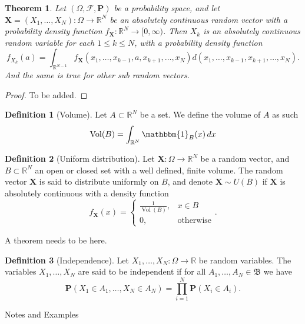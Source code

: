 \documentclass[11pt,a4paper]{article}
\theoremstyle{definition}
\newtheorem{definition}{Definition}[section]
\theoremstyle{plain}
\newtheorem{theorem}{Theorem}[section]
\DeclareMathOperator{\Vol}{Vol}
\newcommand{\R}{\mathbb{R}}
\newcommand{\Prob}{\mathbf{P}}
\renewcommand{\vec}[1]{\boldsymbol{\mathbf{#1}}}
\begin{document}
  \begin{theorem}\label{thm:randvec}
    Let $(\Omega, \mathcal F, \Prob)$ be a probability space, 
    and let $\vec{X} = (X_1,\dots,X_N) \colon \Omega \to \R^N$ be an absolutely
    continuous random vector with a probability density function 
    $f_{\vec{X}} \colon \R^N \to [0,\infty)$.
    Then $X_k$ is an absolutely continuous random variable for each
    $1 \le k \le N$, with a probability density function
    \[
      f_{X_{k}}(a) = 
      \int_{\R^{N-1}} 
      f_{\vec{X}}(x_{1},\dots,x_{k-1},a,x_{k+1},\dots,x_{N})
      d(x_{1},\ldots,x_{k-1},x_{k+1},\dots,x_{N}).
    \]
    And the same is true for other sub random vectors.
  \end{theorem}
  \begin{proof}
    To be added.
  \end{proof}
  
  \begin{definition}[Volume]
    Let $A \subset \R^N$ be a set. We define the volume of $A$ as such
    \[
      \Vol(B) = \int_{\R^N} \mathbbm{1}_B(x)\,dx
    \]
  \end{definition}
  
  \begin{definition}[Uniform distribution]
    Let $\vec{X} \colon \Omega \to \R^N$ be a random vector, 
    and $B \subset \R^N$ an open or closed set with a well defined, finite volume.
    The random vector $\vec{X}$ is said to distribute uniformly on $B$, and
    denote $\vec{X} \sim U(B)$ if $\vec{X}$ is absolutely continuous with a 
    density function
    \[
      f_{\vec{X}}(x) =
      \begin{cases}
        \frac{1}{\Vol(B)}, &x \in B \\
        0, &\text{otherwise}
      \end{cases}.
    \]
  \end{definition}

  A theorem needs to be here.

  \begin{definition}[Independence]
    Let $X_1,\dots,X_N \colon \Omega \to \R$ be random variables.
    The variables $X_1,\dots,X_N$ are said to be independent if
    for all $A_1,\dots,A_N \in \mathfrak B$ we have
    \[
      \Prob(X_1 \in A_1, \dots, X_N \in A_N) =
      \prod_{i=1}^{N} \Prob(X_i \in A_i).
    \]
  \end{definition}

  Notes and Examples
  
\end{document}
